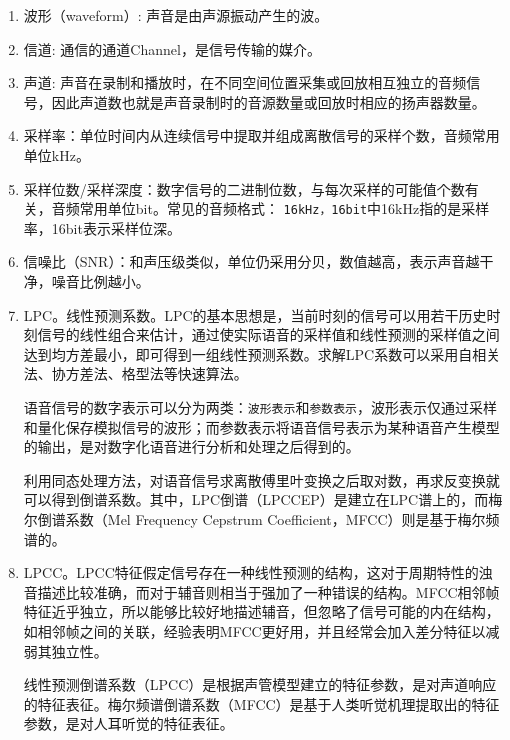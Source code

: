 \documentclass[cn,10pt,math=newtx,citestyle=gb7714-2015,bibstyle=gb7714-2015]{elegantbook}
\begin{document}
\begin{enumerate}
  \item 波形（waveform）: 声音是由声源振动产生的波。
  \item 信道: 通信的通道Channel，是信号传输的媒介。
  \item 声道: 声音在录制和播放时，在不同空间位置采集或回放相互独立的音频信号，因此声道数也就是声音录制时的音源数量或回放时相应的扬声器数量。
  \item 采样率：单位时间内从连续信号中提取并组成离散信号的采样个数，音频常用单位kHz。
  \item 采样位数/采样深度：数字信号的二进制位数，与每次采样的可能值个数有关，音频常用单位bit。常见的音频格式： \lstinline{16kHz，16bit}中16kHz指的是采样率，16bit表示采样位深。
  \item 信噪比（SNR）：和声压级类似，单位仍采用分贝，数值越高，表示声音越干净，噪音比例越小。
  \item LPC。线性预测系数。LPC的基本思想是，当前时刻的信号可以用若干历史时刻信号的线性组合来估计，通过使实际语音的采样值和线性预测的采样值之间达到均方差最小，即可得到一组线性预测系数。求解LPC系数可以采用自相关法、协方差法、格型法等快速算法。
  \begin{note}
    语音信号的数字表示可以分为两类：\lstinline{波形表示}和\lstinline{参数表示}，波形表示仅通过采样和量化保存模拟信号的波形；而参数表示将语音信号表示为某种语音产生模型的输出，是对数字化语音进行分析和处理之后得到的。
  \end{note}

  \begin{note}
    利用同态处理方法，对语音信号求离散傅里叶变换之后取对数，再求反变换就可以得到倒谱系数。其中，LPC倒谱（LPCCEP）是建立在LPC谱上的，而梅尔倒谱系数（Mel Frequency Cepstrum Coefficient，MFCC）则是基于梅尔频谱的。
  \end{note}

  \item LPCC。LPCC特征假定信号存在一种线性预测的结构，这对于周期特性的浊音描述比较准确，而对于辅音则相当于强加了一种错误的结构。MFCC相邻帧特征近乎独立，所以能够比较好地描述辅音，但忽略了信号可能的内在结构，如相邻帧之间的关联，经验表明MFCC更好用，并且经常会加入差分特征以减弱其独立性。
  \begin{note}
    线性预测倒谱系数（LPCC）是根据声管模型建立的特征参数，是对声道响应的特征表征。梅尔频谱倒谱系数（MFCC）是基于人类听觉机理提取出的特征参数，是对人耳听觉的特征表征。
  \end{note}
\end{enumerate}
\end{document}
